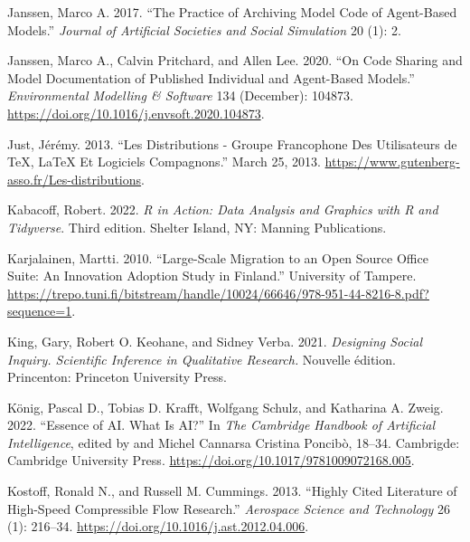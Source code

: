 \documentclass[
  letterpaper,
]{scrbook}
\newlength{\cslhangindent}
\newlength{\cslentryspacingunit} %
\newenvironment{CSLReferences}[2] %
 {%
  \setlength{\parindent}{0pt}
  \ifodd #1
  \let\oldpar\par
  \def\par{\hangindent=\cslhangindent\oldpar}
  \fi
  \setlength{\parskip}{#2\cslentryspacingunit}
 }%
 {}
\begin{document}
\begin{CSLReferences}{1}{0}
\leavevmode{}%
Janssen, Marco A. 2017. {``The {Practice} of {Archiving Model Code} of
{Agent-Based Models}.''} \emph{Journal of Artificial Societies and
Social Simulation} 20 (1): 2.

\leavevmode{}%
Janssen, Marco A., Calvin Pritchard, and Allen Lee. 2020. {``On Code
Sharing and Model Documentation of Published Individual and Agent-Based
Models.''} \emph{Environmental Modelling \& Software} 134 (December):
104873. \url{https://doi.org/10.1016/j.envsoft.2020.104873}.

\leavevmode{}%
Just, Jérémy. 2013. {``Les Distributions - {Groupe} Francophone Des
{Utilisateurs} de {TeX}, {LaTeX} Et Logiciels Compagnons.''} March 25,
2013. \url{https://www.gutenberg-asso.fr/Les-distributions}.

\leavevmode{}%
Kabacoff, Robert. 2022. \emph{R in Action: Data Analysis and Graphics
with {R} and {Tidyverse}}. Third edition. {Shelter Island, NY}: {Manning
Publications}.

\leavevmode{}%
Karjalainen, Martti. 2010. {``Large-Scale Migration to an Open Source
Office Suite: {An} Innovation Adoption Study in {Finland}.''}
{University of Tampere}.
\url{https://trepo.tuni.fi/bitstream/handle/10024/66646/978-951-44-8216-8.pdf?sequence=1}.

\leavevmode{}%
King, Gary, Robert O. Keohane, and Sidney Verba. 2021. \emph{Designing
{Social Inquiry}. {Scientific Inference} in {Qualitative Research}.}
Nouvelle édition. {Princenton}: {Princeton University Press}.

\leavevmode{}%
König, Pascal D., Tobias D. Krafft, Wolfgang Schulz, and Katharina A.
Zweig. 2022. {``Essence of {AI}. {What Is AI}?''} In \emph{The
{Cambridge Handbook} of {Artificial Intelligence}}, edited by and Michel
Cannarsa Cristina Poncibò, 18--34. {Cambrigde}: {Cambridge University
Press}. \url{https://doi.org/10.1017/9781009072168.005}.

\leavevmode{}%
Kostoff, Ronald N., and Russell M. Cummings. 2013. {``Highly Cited
Literature of High-Speed Compressible Flow Research.''} \emph{Aerospace
Science and Technology} 26 (1): 216--34.
\url{https://doi.org/10.1016/j.ast.2012.04.006}.


\end{CSLReferences}
\end{document}

